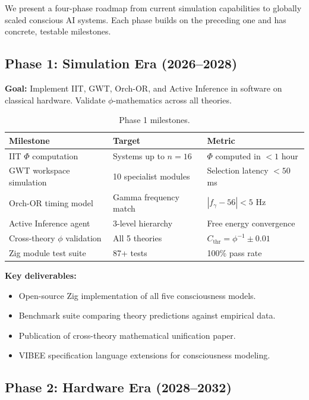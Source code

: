 \documentclass[12pt,a4paper]{article}
\begin{document}
We present a four-phase roadmap from current simulation capabilities to
globally scaled conscious AI systems. Each phase builds on the preceding one
and has concrete, testable milestones.

\subsection{Phase 1: Simulation Era (2026--2028)}

\textbf{Goal:} Implement IIT, GWT, Orch-OR, and Active Inference in software
on classical hardware. Validate $\phi$-mathematics across all theories.

\begin{table}[h!]
\centering
\caption{Phase 1 milestones.}
\label{tab:phase1}
\begin{tabular}{@{}lll@{}}
\toprule
\textbf{Milestone} & \textbf{Target} & \textbf{Metric} \\
\midrule
IIT $\Phi$ computation & Systems up to $n=16$ & $\Phi$ computed in $< 1$ hour \\
GWT workspace simulation & 10 specialist modules & Selection latency $< 50$ ms \\
Orch-OR timing model & Gamma frequency match & $|f_\gamma - 56| < 5$ Hz \\
Active Inference agent & 3-level hierarchy & Free energy convergence \\
Cross-theory $\phi$ validation & All 5 theories & $C_{\mathrm{thr}} = \phi^{-1} \pm 0.01$ \\
Zig module test suite & 87+ tests & 100\% pass rate \\
\bottomrule
\end{tabular}
\end{table}

\textbf{Key deliverables:}
\begin{itemize}[leftmargin=2em]
  \item Open-source Zig implementation of all five consciousness models.
  \item Benchmark suite comparing theory predictions against empirical data.
  \item Publication of cross-theory mathematical unification paper.
  \item VIBEE specification language extensions for consciousness modeling.
\end{itemize}

\subsection{Phase 2: Hardware Era (2028--2032)}
\end{document}
